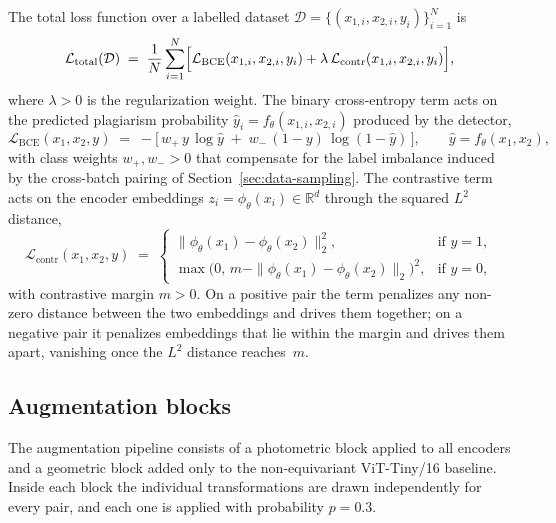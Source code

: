 \documentclass{article}
\begin{document}
The total loss function over a labelled dataset $\mathcal{D} = \{(x_{1,i}, x_{2,i}, y_i)\}_{i=1}^{N}$ is
\begin{equation}\label{eq:loss-total}
  \mathcal{L}_{\mathrm{total}}(\mathcal{D}) \;=\; \frac{1}{N}\sum_{i=1}^{N}\Bigl[\mathcal{L}_{\mathrm{BCE}}(x_{1,i}, x_{2,i}, y_i) + \lambda\,\mathcal{L}_{\mathrm{contr}}(x_{1,i}, x_{2,i}, y_i)\Bigr],
\end{equation}
where $\lambda > 0$ is the regularization weight. The binary cross-entropy term acts on the predicted plagiarism probability $\hat y_i = f_\theta(x_{1,i}, x_{2,i})$ produced by the detector,
\begin{equation}\label{eq:loss-bce}
  \mathcal{L}_{\mathrm{BCE}}(x_1, x_2, y) \;=\; -\bigl[\,w_+\,y\,\log\hat y \;+\; w_-\,(1-y)\,\log(1 - \hat y)\,\bigr], \qquad \hat y = f_\theta(x_1, x_2),
\end{equation}
with class weights $w_+, w_- > 0$ that compensate for the label imbalance induced by the cross-batch pairing of Section~\ref{sec:data-sampling}. The contrastive term acts on the encoder embeddings $z_i = \phi_\theta(x_i)\in\mathbb{R}^d$ through the squared $L^2$ distance,
\begin{equation}\label{eq:loss-contr}
  \mathcal{L}_{\mathrm{contr}}(x_1, x_2, y) \;=\;
  \begin{cases}
    \|\phi_\theta(x_1) - \phi_\theta(x_2)\|_2^2, & \text{if } y = 1,\\[2pt]
    \max\bigl(0,\, m - \|\phi_\theta(x_1) - \phi_\theta(x_2)\|_2\bigr)^2, & \text{if } y = 0,
  \end{cases}
\end{equation}
with contrastive margin $m > 0$. On a positive pair the term penalizes any non-zero distance between the two embeddings and drives them together; on a negative pair it penalizes embeddings that lie within the margin and drives them apart, vanishing once the $L^2$ distance reaches~$m$.

\subsection{Augmentation blocks}\label{sec:aug}

The augmentation pipeline consists of a photometric block applied to all encoders and a geometric block added only to the non-equivariant ViT-Tiny/16 baseline. Inside each block the individual transformations are drawn independently for every pair, and each one is applied with probability $p = 0.3$.
\end{document}
